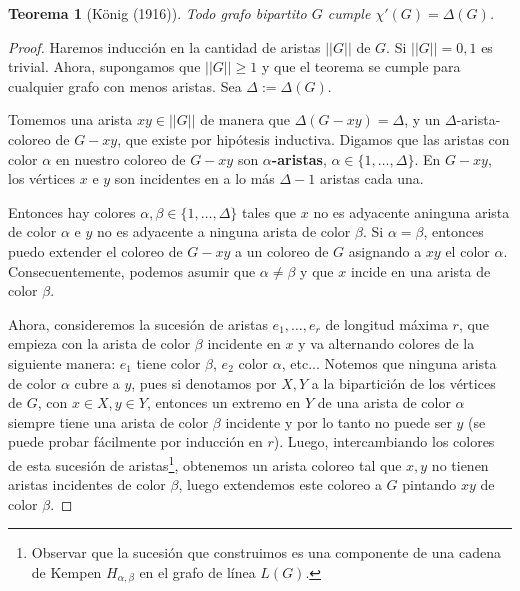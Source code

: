 \documentclass[12pt]{report}
\theoremstyle{plain}
\newtheorem{theorem}{Teorema}[section]
\theoremstyle{definition}
\newcommand{\Abs}[1]{\left \vert \left \vert #1 \right \vert \right \vert}
\begin{document}
\begin{theorem}[König (1916)]\label{th:todo grafo bipartito cumple que su numero cromatico es Delta}
Todo grafo bipartito $G$ cumple $\chi' (G) = \Delta (G)$.
\end{theorem}
\begin{proof}
Haremos inducción en la cantidad de aristas $\Abs G$ de $G$. Si $\Abs G = 0,1$ es trivial. Ahora, supongamos que $\Abs G \geq 1$ y que el teorema se cumple para cualquier grafo con menos aristas. Sea $\Delta := \Delta (G)$.

Tomemos una arista $xy \in \Abs{G}$ de manera que $\Delta (G -xy) = \Delta$, y un $\Delta$-arista-coloreo de $G - xy$, que existe por hipótesis inductiva. Digamos que las aristas con color $\alpha$ en nuestro coloreo de $G - xy$ son \textbf{$\alpha$-aristas}, $\alpha \in \{1, \ldots, \Delta\}$. En $G - xy$, los vértices $x$ e $y$ son incidentes en a lo más $\Delta -1$ aristas cada una.


Entonces hay colores $\alpha, \beta \in \{1,\ldots,\Delta\}$ tales que $x $ no es adyacente aninguna arista de color $\alpha$ e $y$ no es adyacente a ninguna arista de color $\beta$. Si $\alpha = \beta$, entonces puedo extender el coloreo de $G-xy$ a un coloreo de $G$ asignando a $xy$ el color $\alpha$. Consecuentemente, podemos asumir que $\alpha \neq \beta$ y que $x$ incide en una arista de color $\beta$.

Ahora, consideremos la sucesión de aristas $e_1, \ldots, e_r$ de longitud máxima $r$, que empieza con la arista de color $\beta$ incidente en $x$ y va alternando colores de la siguiente manera: $e_1$ tiene color $\beta$, $e_2$ color $\alpha$, etc... Notemos que ninguna arista de color $\alpha$ cubre a $y$, pues si denotamos por $X,Y$ a la bipartición de los vértices de $G$, con $x \in X, y \in Y$, entonces un extremo en $Y$ de una arista de color $\alpha$ siempre tiene una arista de color $\beta$ incidente y por lo tanto no puede ser $y$ (se puede probar fácilmente por inducción en $r$). Luego, intercambiando los colores de esta sucesión de aristas\footnote{Observar que la sucesión que construimos es una componente de una cadena de Kempen $H_{\alpha, \beta}$ en el grafo de línea $L(G)$.}, obtenemos un arista coloreo tal que $x,y$ no tienen aristas incidentes de color $\beta$, luego extendemos este coloreo a $G$ pintando $xy$ de color $\beta$.
\end{proof}
\end{document}
